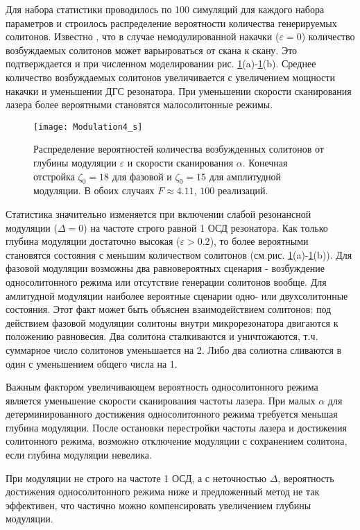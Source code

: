 Для набора статистики проводилось по 100 симуляций для каждого набора параметров и строилось распределение вероятности количества генерируемых солитонов. Известно \cite{Herr2014, Karpov2016}, что в случае немодулированной накачки ($\varepsilon=0$) количество возбуждаемых солитонов может варьироваться от скана к скану. Это подтверждается и при численном моделировании рис. \ref{Mod4}(a)-\ref{Mod4}(b). Среднее количество возбуждаемых солитонов увеличивается с увеличением мощности накачки и уменьшении ДГС резонатора. При уменьшении скорости сканирования лазера более вероятными становятся малосолитонные режимы.

\begin{figure}[ht]
\centering
  \texttt{[image: Modulation4\_s]}
  \caption{Распределение вероятностей количества возбужденных солитонов от глубины модуляции $\varepsilon$ и скорости сканирования $\alpha$. Конечная отстройка $\zeta_0=18$ для фазовой и $\zeta_0=15$ для амплитудной модуляции. В обоих случаях $F\approx 4.11$, $100$ реализаций.}
  \label{Mod4}
\end{figure}

Статистика значительно изменяется при включении слабой резонансной модуляции ($\Delta=0$) на частоте строго равной 1 ОСД резонатора. Как только глубина модуляции достаточно высокая ($\varepsilon> 0.2$), то более вероятными становятся состояния с меньшим количеством солитонов (см рис. \ref{Mod4}(a)-\ref{Mod4}(b)). Для фазовой модуляции возможны два равновероятных сценария - возбуждение односолитонного режима или отсутствие генерации солитонов вообще. Для амлитудной модуляции наиболее вероятные сценарии одно- или двухсолитонные состояния. Этот факт может быть объяснен взаимодействием солитонов: под действием фазовой модуляции солитоны внутри микрорезонатора двигаются к положению равновесия. Два солитона сталкиваются и уничтожаются, т.ч. суммарное число солитонов уменьшается на 2. Либо два солиотна сливаются в один с уменьшением общего числа на 1.

Важным фактором увеличивающем вероятность односолитонного режима является уменьшение скорости сканирования частоты лазера. При малых $\alpha$ для детерминированного достижения односолитонного режима требуется меньшая глубина модуляции. После остановки перестройки частоты лазера и достижения солитонного режима, возможно отключение модуляции с сохранением солитона, если глубина модуляции невелика.

При модуляции не строго на частоте 1 ОСД, а с неточностью $\Delta$, вероятность достижения односолитонного режима ниже и предложенный метод не так эффективен, что частично можно компенсировать увеличением глубины модуляции.

